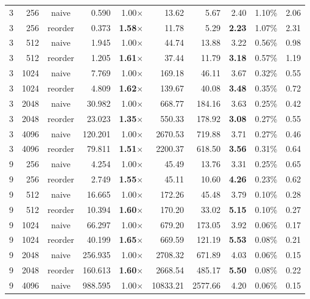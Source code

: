 \documentclass[11pt,a4paper]{article}
\begin{document}
{\begin{longtable}{rrcrrrrrrr}
3 & 256 & naive & 0.590 & 1.00$\times$ & 13.62 & 5.67 & 2.40 & 1.10\% & 2.06 \\
3 & 256 & reorder & 0.373 & \textbf{1.58$\times$} & 11.78 & 5.29 & \textbf{2.23} & 1.07\% & 2.31 \\
\midrule
3 & 512 & naive & 1.945 & 1.00$\times$ & 44.74 & 13.88 & 3.22 & 0.56\% & 0.98 \\
3 & 512 & reorder & 1.205 & \textbf{1.61$\times$} & 37.44 & 11.79 & \textbf{3.18} & 0.57\% & 1.19 \\
\midrule
3 & 1024 & naive & 7.769 & 1.00$\times$ & 169.18 & 46.11 & 3.67 & 0.32\% & 0.55 \\
3 & 1024 & reorder & 4.809 & \textbf{1.62$\times$} & 139.67 & 40.08 & \textbf{3.48} & 0.35\% & 0.72 \\
\midrule
3 & 2048 & naive & 30.982 & 1.00$\times$ & 668.77 & 184.16 & 3.63 & 0.25\% & 0.42 \\
3 & 2048 & reorder & 23.023 & \textbf{1.35$\times$} & 550.33 & 178.92 & \textbf{3.08} & 0.27\% & 0.55 \\
\midrule
3 & 4096 & naive & 120.201 & 1.00$\times$ & 2670.53 & 719.88 & 3.71 & 0.27\% & 0.46 \\
3 & 4096 & reorder & 79.811 & \textbf{1.51$\times$} & 2200.37 & 618.50 & \textbf{3.56} & 0.31\% & 0.64 \\
\midrule
9 & 256 & naive & 4.254 & 1.00$\times$ & 45.49 & 13.76 & 3.31 & 0.25\% & 0.65 \\
9 & 256 & reorder & 2.749 & \textbf{1.55$\times$} & 45.11 & 10.60 & \textbf{4.26} & 0.23\% & 0.62 \\
\midrule
9 & 512 & naive & 16.665 & 1.00$\times$ & 172.26 & 45.48 & 3.79 & 0.10\% & 0.28 \\
9 & 512 & reorder & 10.394 & \textbf{1.60$\times$} & 170.20 & 33.02 & \textbf{5.15} & 0.10\% & 0.27 \\
\midrule
9 & 1024 & naive & 66.297 & 1.00$\times$ & 679.20 & 173.05 & 3.92 & 0.06\% & 0.17 \\
9 & 1024 & reorder & 40.199 & \textbf{1.65$\times$} & 669.59 & 121.19 & \textbf{5.53} & 0.08\% & 0.21 \\
\midrule
9 & 2048 & naive & 256.935 & 1.00$\times$ & 2708.32 & 671.89 & 4.03 & 0.06\% & 0.15 \\
9 & 2048 & reorder & 160.613 & \textbf{1.60$\times$} & 2668.54 & 485.17 & \textbf{5.50} & 0.08\% & 0.22 \\
\midrule
9 & 4096 & naive & 988.595 & 1.00$\times$ & 10833.21 & 2577.66 & 4.20 & 0.06\% & 0.15 \\

\end{longtable}}
\end{document}
